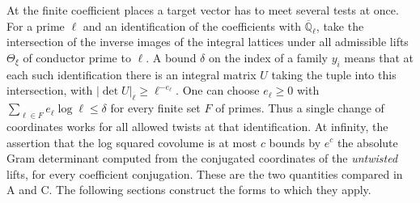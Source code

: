 At the finite coefficient places a target vector has to meet several tests at once. For a prime \(\ell\) and an identification of the coefficients with \(\overline{\mathbb Q}_\ell\), take the intersection of the inverse images of the integral lattices under all admissible lifts \(\Theta_\xi\) of conductor prime to \(\ell\). A bound \(\delta\) on the index of a family \(y_i\) means that at each such identification there is an integral matrix \(U\) taking the tuple into this intersection, with \(|\det U|_\ell\ge\ell^{-e_\ell}\). One can choose \(e_\ell\ge0\) with \(\sum_{\ell\in F}e_\ell\log\ell\le\delta\) for every finite set \(F\) of primes. Thus a single change of coordinates works for all allowed twists at that identification. At infinity, the assertion that the log squared covolume is at most \(c\) bounds by \(e^c\) the absolute Gram determinant computed from the conjugated coordinates of the \emph{untwisted} lifts, for every coefficient conjugation. These are the two quantities compared in A and C. The following sections construct the forms to which they apply.
